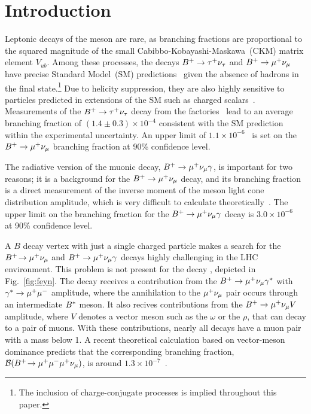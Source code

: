 
\section{Introduction}
\label{sec:Introduction}

Leptonic decays of the \Bp meson are rare, as branching fractions are proportional to the squared magnitude of the small
Cabibbo-Kobayashi-Maskawa~(CKM) matrix element $V_{ub}$. Among these
processes, the decays  $B^{+}\rightarrow{\ensuremath{\tau^+}}{\ensuremath{{\nu}_\tau}}$ and ${{{B}^+}}\rightarrow{\ensuremath{\mu^+}}{\ensuremath{{\nu}_\mu}}$ have
precise Standard Model~(SM) predictions~\cite{Silverman:1988gc} given
the absence of hadrons in the final state.\footnote{The inclusion of
charge-conjugate processes is implied throughout this paper.}  Due to
helicity suppression, they are also highly sensitive to particles
predicted in extensions of the SM such as charged
scalars~\cite{Isidori:2006pk}. Measurements of the ${{{B}^+}}\rightarrow{\ensuremath{\tau^+}}{\ensuremath{{\nu}_\tau}}$
decay from the \B factories~\cite{Kronenbitter:2015kls, Adachi:2012mm, 
Lees:2012ju,Aubert:2009wt} lead to an average branching fraction of 
$(1.4\pm0.3)\times 10^{-4}$\cite{HFLAV16} consistent with the SM 
prediction within the experimental uncertainty. An upper limit of $1.1\times 10^{-6}$~\cite{Sibidanov:2017vph} is set on the ${{{B}^+}}\rightarrow{\ensuremath{\mu^+}}{\ensuremath{{\nu}_\mu}}$ branching fraction at 90\% confidence level.

The radiative version of the muonic decay, ${{{B}^+}}\rightarrow{\ensuremath{\mu^+}}{\ensuremath{{\nu}_\mu}}\gamma$, is important for two reasons; it 
is a background for the ${{{B}^+}}\rightarrow{\ensuremath{\mu^+}}{\ensuremath{{\nu}_\mu}}$ decay, and its branching fraction is a direct measurement of the 
inverse moment of the \B meson light cone distribution amplitude, which
is very difficult to calculate theoretically~\cite{Beneke:2011nf}.
The upper limit on the branching fraction for the ${{{B}^+}}\rightarrow{\ensuremath{\mu^+}}{\ensuremath{{\nu}_\mu}}\gamma$ decay is $3.0\times
10^{-6}$~\cite{Gelb:2018end} at 90\%
confidence level.

A $B$ decay vertex with just a single charged particle makes a search for the \mbox{${{{B}^+}}\!\rightarrow \mu^{+}\nu_\mu$} and ${{{B}^+}}\rightarrow{\ensuremath{\mu^+}}{\ensuremath{{\nu}_\mu}}\gamma$ decays highly challenging in the LHC environment. This problem is not present for the decay \mbox{\Bmumumu}, depicted in Fig.~\ref{fig:feyn}. The decay receives a contribution from the ${{{B}^+}}\rightarrow{\ensuremath{\mu^+}}{\ensuremath{{\nu}_\mu}}\gamma^{*}$ with $\gamma^{*}\rightarrow{\ensuremath{\mu^+\mu^-}}$ amplitude, where the annihilation to the ${\mu^+}{{\nu}_\mu}$ pair occurs through an intermediate ${B}^\ast$ meson. It also recives contributions from the ${{{B}^+}}\rightarrow{\ensuremath{\mu^+}}{\ensuremath{{\nu}_\mu}} V$ amplitude, where $V$ denotes a vector meson such as the $\omega$ or the $\rho$, that can decay to a pair of muons. With these contributions, nearly all decays have a muon pair with a mass below 1\gevcc. A recent theoretical calculation based on vector-meson dominance predicts that the corresponding branching fraction, $\mathcal{B}({{{B}^+}}\!\rightarrow {\ensuremath{\mu^+}}{\ensuremath{\mu^-}}{\ensuremath{\mu^+}}{\ensuremath{{\nu}_\mu}})$, is around $1.3 \times 10^{-7}$~\cite{Danilina:2018uzr}. 


